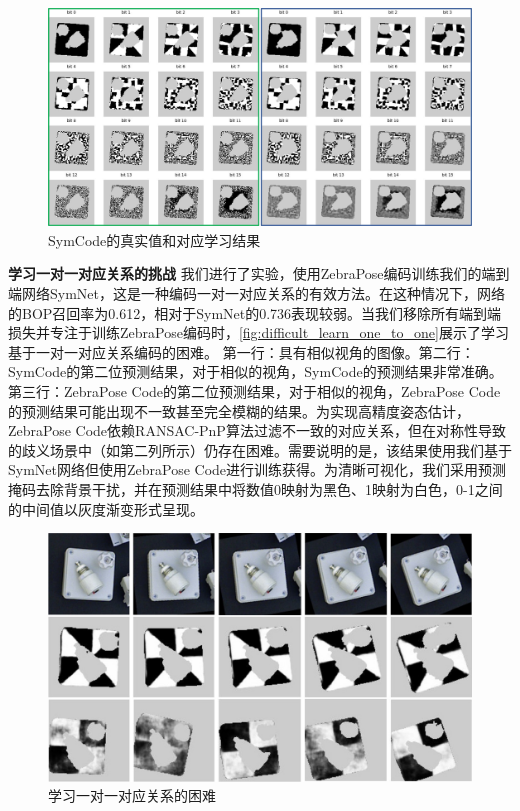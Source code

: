 \begin{figure}[ht]
        \centerline{\includegraphics[width=1.0\textwidth]{figure/symnet/compare_gt_est.jpg}}
        \caption{SymCode的真实值和对应学习结果}
        \label{fig:compare_gt_est}
\end{figure}

\textbf{学习一对一对应关系的挑战 } 我们进行了实验，使用ZebraPose编码训练我们的端到端网络SymNet，这是一种编码一对一对应关系的有效方法。在这种情况下，网络的BOP召回率为0.612，相对于SymNet的0.736表现较弱。当我们移除所有端到端损失并专注于训练ZebraPose编码时，\autoref{fig:difficult_learn_one_to_one}展示了学习基于一对一对应关系编码的困难。 第一行：具有相似视角的图像。第二行：SymCode的第二位预测结果，对于相似的视角，SymCode的预测结果非常准确。第三行：ZebraPose Code的第二位预测结果，对于相似的视角，ZebraPose Code的预测结果可能出现不一致甚至完全模糊的结果。为实现高精度姿态估计，ZebraPose Code依赖RANSAC-PnP算法过滤不一致的对应关系，但在对称性导致的歧义场景中（如第二列所示）仍存在困难。需要说明的是，该结果使用我们基于SymNet网络但使用ZebraPose Code进行训练获得。为清晰可视化，我们采用预测掩码去除背景干扰，并在预测结果中将数值0映射为黑色、1映射为白色，0-1之间的中间值以灰度渐变形式呈现。

\begin{figure}[ht]
    \centerline{\includegraphics[width=1.0\textwidth]{figure/symnet/difficulty_learn_one_to_one.jpg}}
    \caption{学习一对一对应关系的困难}
    \label{fig:difficult_learn_one_to_one}
\end{figure}

